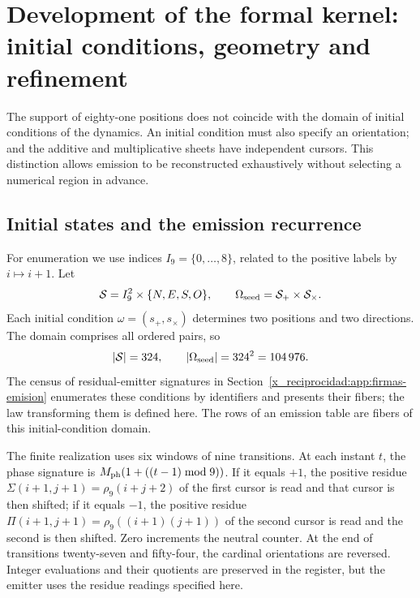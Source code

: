 \section{Development of the formal kernel: initial conditions, geometry and refinement}
\label{x_reciprocidad:sec:extension}

The support of eighty-one positions does not coincide with the domain of initial conditions of the dynamics. An initial condition must also specify an orientation; and the additive and multiplicative sheets have independent cursors. This distinction allows emission to be reconstructed exhaustively without selecting a numerical region in advance.

\subsection{Initial states and the emission recurrence}

For enumeration we use indices \(I_9=\{0,\ldots,8\}\), related to the positive labels by \(i\mapsto i+1\). Let
\[
 \mathcal S=I_9^2\times\{N,E,S,O\},\qquad
 \Omega_{\rm seed}=\mathcal S_+\times\mathcal S_\times.
\]
Each initial condition \(\omega=(s_+,s_\times)\) determines two positions and two directions. The domain comprises all ordered pairs, so
\begin{equation}
 |\mathcal S|=324,\qquad |\Omega_{\rm seed}|=324^2=104\,976.
 \label{x_reciprocidad:eq:semillas}
\end{equation}
The census of residual-emitter signatures in Section~\ref{x_reciprocidad:app:firmas-emision} enumerates these conditions by identifiers and presents their fibers; the law transforming them is defined here. The rows of an emission table are fibers of this initial-condition domain.

The finite realization uses six windows of nine transitions. At each instant \(t\), the phase signature is \(M_{\rm ph}(1+((t-1)\bmod9))\). If it equals \(+1\), the positive residue \(\Sigma(i+1,j+1)=\rho_9(i+j+2)\) of the first cursor is read and that cursor is then shifted; if it equals \(-1\), the positive residue \(\Pi(i+1,j+1)=\rho_9((i+1)(j+1))\) of the second cursor is read and the second is then shifted. Zero increments the neutral counter. At the end of transitions twenty-seven and fifty-four, the cardinal orientations are reversed. Integer evaluations and their quotients are preserved in the register, but the emitter uses the residue readings specified here.

